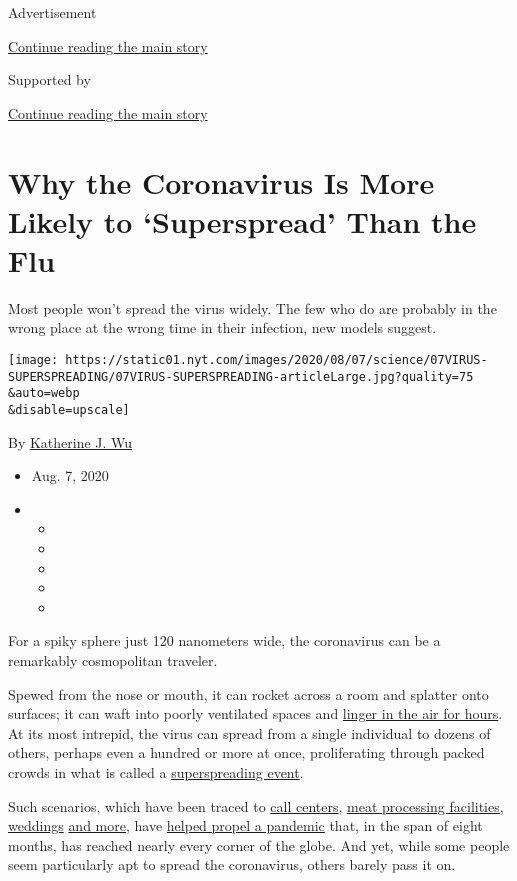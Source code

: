 Advertisement

\protect\hyperlink{after-top}{Continue reading the main story}

Supported by

\protect\hyperlink{after-sponsor}{Continue reading the main story}

\hypertarget{why-the-coronavirus-is-more-likely-to-superspread-than-the-flu}{%
\section{Why the Coronavirus Is More Likely to `Superspread' Than the
Flu}\label{why-the-coronavirus-is-more-likely-to-superspread-than-the-flu}}

Most people won't spread the virus widely. The few who do are probably
in the wrong place at the wrong time in their infection, new models
suggest.

\texttt{[image: https://static01.nyt.com/images/2020/08/07/science/07VIRUS-SUPERSPREADING/07VIRUS-SUPERSPREADING-articleLarge.jpg?quality=75\\\&auto=webp\\\&disable=upscale]}

By \href{https://www.nytimes.com/by/katherine-j--wu}{Katherine J. Wu}

\begin{itemize}
\item
  Aug. 7, 2020
\item
  \begin{itemize}
  \item
  \item
  \item
  \item
  \item
  \end{itemize}
\end{itemize}

For a spiky sphere just 120 nanometers wide, the coronavirus can be a
remarkably cosmopolitan traveler.

Spewed from the nose or mouth, it can rocket across a room and splatter
onto surfaces; it can waft into poorly ventilated spaces and
\href{https://www.nytimes.com/2020/07/09/health/virus-aerosols-who.html}{linger
in the air for hours}. At its most intrepid, the virus can spread from a
single individual to dozens of others, perhaps even a hundred or more at
once, proliferating through packed crowds in what is called a
\href{https://www.nytimes.com/2020/06/30/science/how-coronavirus-spreads.html}{superspreading
event}.

Such scenarios, which have been traced to
\href{https://wwwnc.cdc.gov/eid/article/26/8/20-1274_article}{call
centers},
\href{https://www.nytimes.com/2020/04/15/us/coronavirus-south-dakota-meat-plant-refugees.html}{meat
processing facilities},
\href{https://wwwnc.cdc.gov/eid/article/26/9/20-1469_article?deliveryName=USCDC_333-DM28908}{weddings}
\href{https://www.nytimes.com/2020/03/30/us/coronavirus-funeral-albany-georgia.html}{and
more}, have
\href{https://www.nytimes.com/2020/06/02/opinion/coronavirus-superspreaders.html}{helped
propel a pandemic} that, in the span of eight months, has reached nearly
every corner of the globe. And yet, while some people seem particularly
apt to spread the coronavirus, others barely pass it on.

